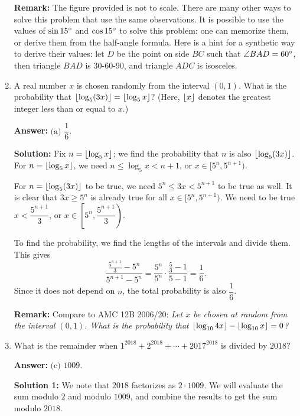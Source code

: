 \documentclass[11pt,paper=letter]{scrartcl}
\begin{document}
\begin{enumerate}[left=0pt]
\textbf{Remark:} The figure provided is not to scale. There are many other ways to solve this problem that use the same observations. It is possible to use the values of $\sin 15^\circ$ and $\cos 15^\circ$ to solve this problem: one can memorize them, or derive them from the half-angle formula. Here is a hint for a synthetic way to derive their values: let $D$ be the point on side $BC$ such that $\angle BAD = 60^\circ$, then triangle $BAD$ is 30-60-90, and triangle $ADC$ is isosceles. 

\item A real number $x$ is chosen randomly from the interval $(0, 1)$. What is the probability that $\left\lfloor \log_5(3x) \right\rfloor = \left\lfloor \log_5 x \right\rfloor$? (Here, $\left\lfloor x \right\rfloor$ denotes the greatest integer less than or equal to $x$.)


\textbf{Answer:} $\boxed{\text{(a) }\dfrac16}$.

\textbf{Solution:} Fix $n = \left\lfloor \log_5 x \right\rfloor$; we find the probability that $n$ is also $\left\lfloor \log_5(3x) \right\rfloor$.  For $n = \left\lfloor \log_5 x \right\rfloor$, we need $n \leq \log_5 x < n+1$, or $x \in [5^n, 5^{n+1})$.

For $n = \left\lfloor \log_5(3x) \right\rfloor$ to be true, we need $5^n \leq 3x < 5^{n+1}$ to be true as well. It is clear that $3x \geq 5^n$ is already true for all $x \in [5^n, 5^{n+1})$. We need to be true $x < \dfrac{5^{n+1}}3$, or $x \in \left[5^n, \dfrac{5^{n+1}}3\right)$.

To find the probability, we find the lengths of the intervals and divide them. This gives $$\frac{\frac{5^{n+1}}3 - 5^n}{5^{n+1} - 5^n} = \frac{5^n}{5^n} \cdot \frac{\frac53 - 1}{5 - 1} = \frac16.$$ Since it does not depend on $n$, the total probability is also $\dfrac16$.

\textbf{Remark:} Compare to AMC 12B 2006/20: \emph{Let $x$ be chosen at random from the interval $(0, 1)$. What is the probability that $\left\lfloor \log_{10} 4x \right\rfloor - \left\lfloor \log_{10} x \right\rfloor = 0$?}

\item What is the remainder when $1^{2018} + 2^{2018} + \cdots + 2017^{2018}$ is divided by $2018$?


\textbf{Answer:} $\boxed{\text{(c) }1009}$.

\textbf{Solution 1:} We note that $2018$ factorizes as $2 \cdot 1009$. We will evaluate the sum modulo $2$ and modulo $1009$, and combine the results to get the sum modulo $2018$.


\end{enumerate}
\end{document}
